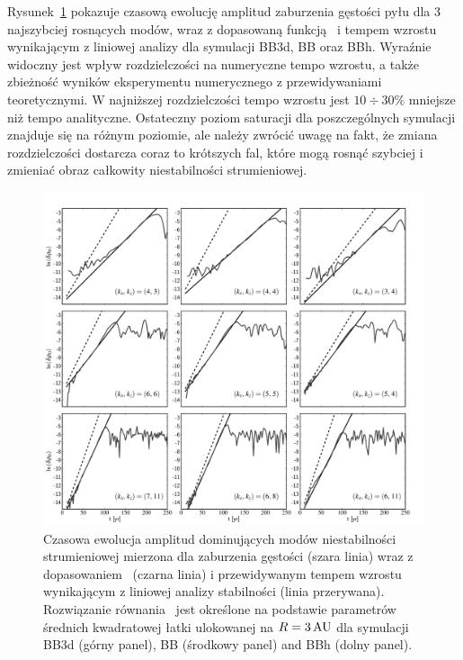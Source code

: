 \par Rysunek~\ref{fig8} pokazuje czasową ewolucję amplitud zaburzenia gęstości
pyłu dla 3 najszybciej rosnących modów, wraz z dopasowaną funkcją~
i tempem wzrostu wynikającym z liniowej analizy dla symulacji BB3d, BB oraz BBh.
Wyraźnie widoczny jest wpływ rozdzielczości na numeryczne tempo wzrostu, a także
zbieżność wyników eksperymentu numerycznego z przewidywaniami teoretycznymi. W
najniższej rozdzielczości tempo wzrostu jest $10\div30\%$ mniejsze niż tempo
analityczne. Ostateczny poziom saturacji dla poszczególnych symulacji znajduje
się na różnym poziomie, ale należy zwrócić uwagę na fakt, że zmiana
rozdzielczości dostarcza coraz to krótszych fal, które mogą rosnąć szybciej i
zmieniać obraz całkowity niestabilności strumieniowej.
 
\begin{figure} 
   \includegraphics[width=0.98\linewidth]{figures/fig8}
   \caption{Czasowa ewolucja amplitud dominujących modów niestabilności
      strumieniowej mierzona dla zaburzenia gęstości (szara linia) wraz z
      dopasowaniem~ (czarna linia) i przewidywanym tempem wzrostu
      wynikającym z liniowej analizy stabilności (linia przerywana).
      Rozwiązanie równania~ jest określone na podstawie
      parametrów średnich kwadratowej łatki ulokowanej na $R=3\hbox{$\thinspace\textrm{AU}$}$ dla symulacji
      BB3d (górny panel), BB (środkowy panel) and BBh (dolny panel). 
   }
   \label{fig8}
\end{figure}


